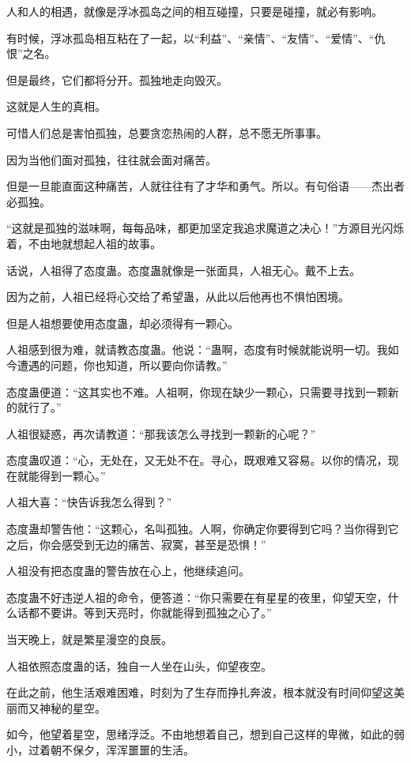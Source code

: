 \begin{this_body}
人和人的相遇，就像是浮冰孤岛之间的相互碰撞，只要是碰撞，就必有影响。

有时候，浮冰孤岛相互粘在了一起，以“利益”、“亲情”、“友情”、“爱情”、“仇恨”之名。

但是最终，它们都将分开。孤独地走向毁灭。

这就是人生的真相。

可惜人们总是害怕孤独，总要贪恋热闹的人群，总不愿无所事事。

因为当他们面对孤独，往往就会面对痛苦。

但是一旦能直面这种痛苦，人就往往有了才华和勇气。所以。有句俗语——杰出者必孤独。

“这就是孤独的滋味啊，每每品味，都更加坚定我追求魔道之决心！”方源目光闪烁着，不由地就想起人祖的故事。

话说，人祖得了态度蛊。态度蛊就像是一张面具，人祖无心。戴不上去。

因为之前，人祖已经将心交给了希望蛊，从此以后他再也不惧怕困境。

但是人祖想要使用态度蛊，却必须得有一颗心。

人祖感到很为难，就请教态度蛊。他说：“蛊啊，态度有时候就能说明一切。我如今遭遇的问题，你也知道，所以要向你请教。”

态度蛊便道：“这其实也不难。人祖啊，你现在缺少一颗心，只需要寻找到一颗新的就行了。”

人祖很疑惑，再次请教道：“那我该怎么寻找到一颗新的心呢？”

态度蛊叹道：“心，无处在，又无处不在。寻心，既艰难又容易。以你的情况，现在就能得到一颗心。”

人祖大喜：“快告诉我怎么得到？”

态度蛊却警告他：“这颗心，名叫孤独。人啊，你确定你要得到它吗？当你得到它之后，你会感受到无边的痛苦、寂寞，甚至是恐惧！”

人祖没有把态度蛊的警告放在心上，他继续追问。

态度蛊不好违逆人祖的命令，便答道：“你只需要在有星星的夜里，仰望天空，什么话都不要讲。等到天亮时，你就能得到孤独之心了。”

当天晚上，就是繁星漫空的良辰。

人祖依照态度蛊的话，独自一人坐在山头，仰望夜空。

在此之前，他生活艰难困难，时刻为了生存而挣扎奔波，根本就没有时间仰望这美丽而又神秘的星空。

如今，他望着星空，思绪浮泛。不由地想着自己，想到自己这样的卑微，如此的弱小，过着朝不保夕，浑浑噩噩的生活。


\end{this_body}
